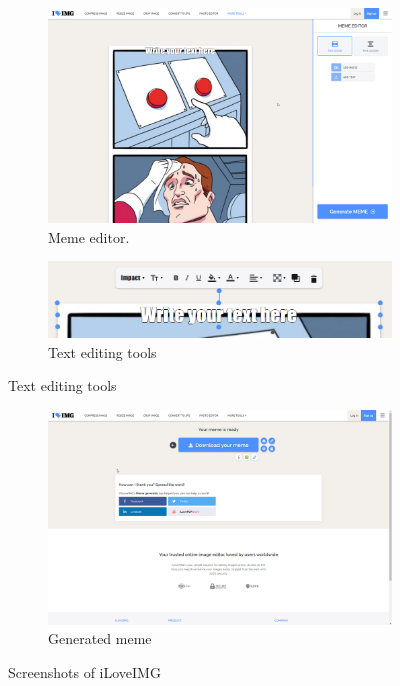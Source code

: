 \begin{figure}\ContinuedFloat
    \begin{subfigure}{\textwidth}
        \centering
        \includegraphics[width=\textwidth]{text/img/iloveimg/editor.png}
        \caption{Meme editor.}
        \label{fig:iloveimg-meme-editor}
    \end{subfigure}
    \begin{subfigure}{\textwidth}
        \centering
        \includegraphics[width=\linewidth]{text/img/iloveimg/text-edit.png}
        \caption{Text editing tools}
        \label{fig:iloveimg-text-edit}
    \end{subfigure}
\end{figure}
\begin{figure}\ContinuedFloat
    \begin{subfigure}{\textwidth}
        \centering
        \includegraphics[width=\textwidth]{text/img/iloveimg/generated-meme.png}
        \caption{Generated meme}
        \label{fig:iloveimg-generated-meme}
    \end{subfigure}
    \caption{Screenshots of iLoveIMG}
    \label{fig:iloveimg}
\end{figure}

